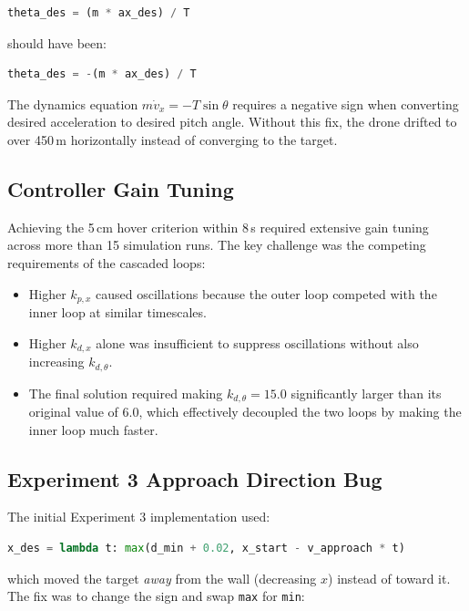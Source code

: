 \documentclass[12pt]{article}
\begin{document}
\begin{lstlisting}[language=Python]
theta_des = (m * ax_des) / T
\end{lstlisting}

should have been:

\begin{lstlisting}[language=Python]
theta_des = -(m * ax_des) / T
\end{lstlisting}

The dynamics equation $m\dot{v}_x = -T\sin\theta$ requires a negative sign
when converting desired acceleration to desired pitch angle. Without this
fix, the drone drifted to over 450\,m horizontally instead of converging
to the target.

\subsection{Controller Gain Tuning}

Achieving the 5\,cm hover criterion within 8\,s required extensive gain
tuning across more than 15 simulation runs. The key challenge was the
competing requirements of the cascaded loops:

\begin{itemize}
    \item Higher $k_{p,x}$ caused oscillations because the outer loop
          competed with the inner loop at similar timescales.
    \item Higher $k_{d,x}$ alone was insufficient to suppress oscillations
          without also increasing $k_{d,\theta}$.
    \item The final solution required making $k_{d,\theta} = 15.0$
          significantly larger than its original value of 6.0, which
          effectively decoupled the two loops by making the inner loop
          much faster.
\end{itemize}

\subsection{Experiment 3 Approach Direction Bug}

The initial Experiment 3 implementation used:

\begin{lstlisting}[language=Python]
x_des = lambda t: max(d_min + 0.02, x_start - v_approach * t)
\end{lstlisting}

which moved the target \emph{away} from the wall (decreasing $x$) instead
of toward it. The fix was to change the sign and swap \texttt{max} for
\texttt{min}:
\end{document}
